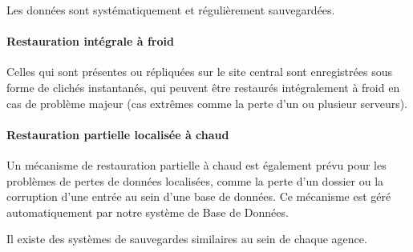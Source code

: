 Les données sont systématiquement et régulièrement sauvegardées.

\paragraph{Restauration intégrale à froid}

Celles qui sont présentes ou répliquées
sur le site central sont enregistrées sous forme de clichés instantanés, qui peuvent être restaurés
intégralement à froid en cas de problème majeur (cas extrêmes comme la perte d'un ou plusieur serveurs).

\paragraph{Restauration partielle localisée à chaud}

Un mécanisme de restauration partielle à chaud est également prévu pour
les problèmes de pertes de données localisées, comme la perte d'un dossier ou la corruption d'une entrée
au sein d'une base de données. Ce mécanisme est géré automatiquement par notre système de Base de Données.

Il existe des systèmes de sauvegardes similaires au sein de chaque agence.
